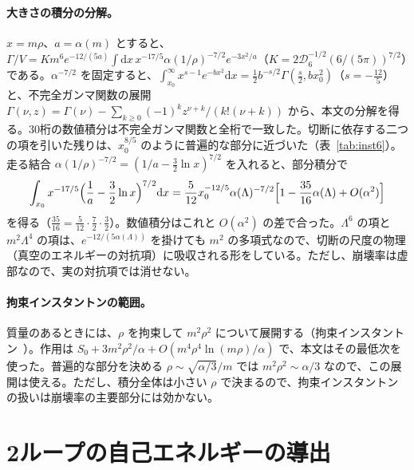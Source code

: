 \documentclass[a4paper,10pt]{ltjsarticle}
\newcommand{\dd}{\mathrm{d}}
\begin{document}
\paragraph{大きさの積分の分解。}$x=m\rho$、$a=\alpha(m)$ とすると、$\Gamma/V=Km^6e^{-12/(5a)}\int\dd x\,x^{-17/5}\alpha(1/\rho)^{-7/2}e^{-3x^2/a}$（$K=2\mathcal D_6^{-1/2}(6/(5\pi))^{7/2}$）である。$\alpha^{-7/2}$ を固定すると、$\int_{x_0}^\infty x^{s-1}e^{-bx^2}\dd x=\frac12b^{-s/2}\Gamma(\frac s2,bx_0^2)$（$s=-\frac{12}5$）と、不完全ガンマ関数の展開 $\Gamma(\nu,z)=\Gamma(\nu)-\sum_{k\ge0}(-1)^kz^{\nu+k}/(k!(\nu+k))$ から、本文の分解を得る。30桁の数値積分は不完全ガンマ関数と全桁で一致した。切断に依存する二つの項を引いた残りは、$x_0^{8/5}$ のように普遍的な部分に近づいた（表~\ref{tab:inst6}）。走る結合 $\alpha(1/\rho)^{-7/2}=(1/a-\frac32\ln x)^{7/2}$ を入れると、部分積分で
\begin{equation*}
\int_{x_0}x^{-17/5}\Bigl(\frac1a-\frac32\ln x\Bigr)^{7/2}\dd x=\frac5{12}x_0^{-12/5}\alpha(\Lambda)^{-7/2}\Bigl[1-\frac{35}{16}\alpha(\Lambda)+O(\alpha^2)\Bigr]
\end{equation*}
を得る（$\frac{35}{16}=\frac5{12}\cdot\frac72\cdot\frac32$）。数値積分はこれと $O(\alpha^2)$ の差で合った。$\Lambda^6$ の項と $m^2\Lambda^4$ の項は、$e^{-12/(5\alpha(\Lambda))}$ を掛けても $m^2$ の多項式なので、切断の尺度の物理（真空のエネルギーの対抗項）に吸収される形をしている。ただし、崩壊率は虚部なので、実の対抗項では消せない。

\paragraph{拘束インスタントンの範囲。}質量のあるときには、$\rho$ を拘束して $m^2\rho^2$ について展開する（拘束インスタントン~\cite{affleck}）。作用は $S_0+3m^2\rho^2/\alpha+O(m^4\rho^4\ln(m\rho)/\alpha)$ で、本文はその最低次を使った。普遍的な部分を決める $\rho\sim\sqrt{\alpha/3}/m$ では $m^2\rho^2\sim\alpha/3$ なので、この展開は使える。ただし、積分全体は小さい $\rho$ で決まるので、拘束インスタントンの扱いは崩壊率の主要部分には効かない。

\section{2ループの自己エネルギーの導出}\label{app:twoloop}
\end{document}
